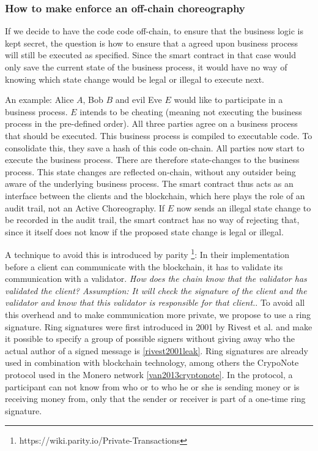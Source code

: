 \documentclass[runningheads]{llncs}
\begin{document}
\subsubsection{How to make enforce an off-chain choreography}

If we decide to have the code code off-chain, to ensure that the business logic is kept secret, the question is how to ensure that a agreed upon business process will still be executed as specified. Since the smart contract in that case would only save the current state of the business process, it would have no way of knowing which state change would be legal or illegal to execute next.

An example: Alice $A$, Bob $B$ and evil Eve $E$ would like to participate in a business process. $E$ intends to be cheating (meaning not executing the business process in the pre-defined order). All three parties agree on a business process that should be executed. This business process is compiled to executable code. To consolidate this, they save a hash of this code on-chain. All parties now start to execute the business process. There are therefore state-changes to the business process. This state changes are reflected on-chain, without any outsider being aware of the underlying business process. The smart contract thus acts as an interface between the clients and the blockchain, which here plays the role of an audit trail, not an Active Choreography. If $E$ now sends an illegal state change to be recorded in the audit trail, the smart contract has no way of rejecting that, since it itself does not know if the proposed state change is legal or illegal.


A technique to avoid this is introduced by parity \footnote{https://wiki.parity.io/Private-Transactions}: In their implementation before a client can communicate with the blockchain, it has to validate its communication with a validator. \textit{How does the chain know that the validator has validated the client? Assumption: It will check the signature of the client and the validator and know that this validator is responsible for that client.}. To avoid all this overhead and to make communication more private, we propose to use a ring signature. Ring signatures were first introduced in 2001 by Rivest et al. and make it possible to specify a group of possible signers without giving away who the actual author of a signed message is \ref{rivest2001leak}. Ring signatures are already used in combination with blockchain technology, among others the CrypoNote protocol used in the Monero network \ref{van2013cryptonote}. In the protocol, a participant can not know from who or to who he or she is sending money or is receiving money from, only that the sender or receiver is part of a one-time ring signature.
\end{document}
